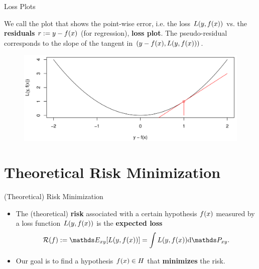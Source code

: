 \begin{vbframe}{Loss Plots}

We call the plot that shows the point-wise error, i.e. the loss $L(y, f(x))$ vs. the \textbf{residuals} $r := y - f(x)$ (for regression), \textbf{loss plot}. The pseudo-residual corresponds to the slope of the tangent in $\left(y - f(x), L(y, f(x)) \right)$. 

\vspace*{0.5cm}


\begin{figure}
\includegraphics[width = 1\linewidth]{figure_man/loss.png}
\end{figure}



\end{vbframe}



\section{Theoretical Risk Minimization}


\begin{vbframe}{(Theoretical) Risk Minimization}

\begin{itemize}
  \item The (theoretical) \textbf{risk} associated with a certain hypothesis $f(x)$ measured by a loss function $L(y, f(x))$ is the \textbf{expected loss}
  $$ \riskf := \E_{xy} [\Lxy] = \int \Lxy \text{d}\Pxy. $$
  \item Our goal is to find a hypothesis $f(x) \in H$ that \textbf{minimizes} the risk.
\end{itemize}

\end{vbframe}

